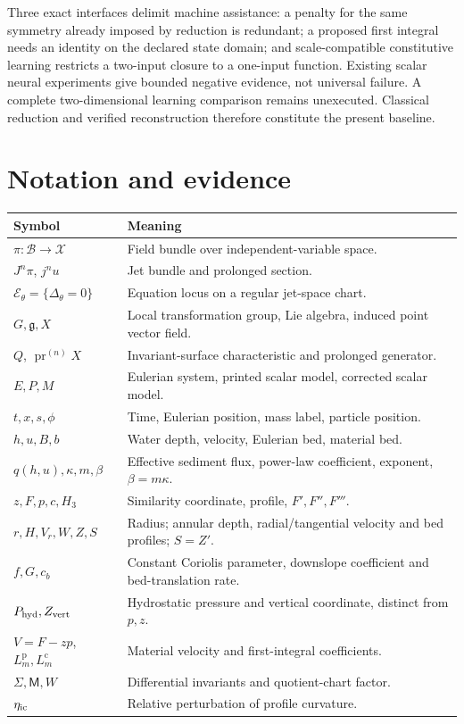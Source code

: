 \documentclass[11pt,a4paper,oneside]{report}
\numberwithin{equation}{chapter}
\newcommand{\E}{\mathcal E}
\newcommand{\pr}{\operatorname{pr}}
\begin{document}
Three exact interfaces delimit machine assistance: a penalty for the same symmetry already imposed by reduction is redundant; a proposed first integral needs an identity on the declared state domain; and scale-compatible constitutive learning restricts a two-input closure to a one-input function. Existing scalar neural experiments give bounded negative evidence, not universal failure. A complete two-dimensional learning comparison remains unexecuted. Classical reduction and verified reconstruction therefore constitute the present baseline.

\chapter*{Notation and evidence}
\begin{longtable}{@{}p{}p{}@{}}
\toprule Symbol & Meaning\\\midrule
$\pi:\mathcal B\to\mathcal X$ & Field bundle over independent-variable space.\\
$J^n\pi$, $j^nu$ & Jet bundle and prolonged section.\\
$\E_\theta=\{\Delta_\theta=0\}$ & Equation locus on a regular jet-space chart.\\
$G,\mathfrak g,X$ & Local transformation group, Lie algebra, induced point vector field.\\
$Q$, $\pr^{(n)}X$ & Invariant-surface characteristic and prolonged generator.\\
$E,P,M$ & Eulerian system, printed scalar model, corrected scalar model.\\
$t,x,s,\phi$ & Time, Eulerian position, mass label, particle position.\\
$h,u,B,b$ & Water depth, velocity, Eulerian bed, material bed.\\
$q(h,u),\kappa,m,\beta$ & Effective sediment flux, power-law coefficient, exponent, $\beta=m\kappa$.\\
$z,F,p,c,H_3$ & Similarity coordinate, profile, $F',F'',F'''$.\\
$r,H,V_r,W,Z,S$ & Radius; annular depth, radial/tangential velocity and bed profiles; $S=Z'$.\\
$f,G,c_b$ & Constant Coriolis parameter, downslope coefficient and bed-translation rate.\\
$P_{\rm hyd},Z_{\rm vert}$ & Hydrostatic pressure and vertical coordinate, distinct from $p,z$.\\
$V=F-zp$, $L_m^{\mathrm p},L_m^{\mathrm c}$ & Material velocity and first-integral coefficients.\\
$\Sigma,\mathsf M,W$ & Differential invariants and quotient-chart factor.\\
$\eta_{\rm ic}$ & Relative perturbation of profile curvature.\\\bottomrule
\end{longtable}
\end{document}
